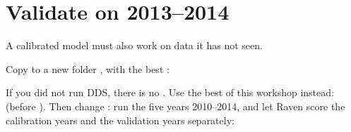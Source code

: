 \section{Validate on 2013--2014}
A calibrated model must also work on data it has not seen.

Copy  to a new folder , with the best :
If you did not run DDS, there is no . Use the best  of this workshop instead:
 (before ).
Then change : run the five years 2010--2014, and let Raven score the calibration years and the validation
years separately:


